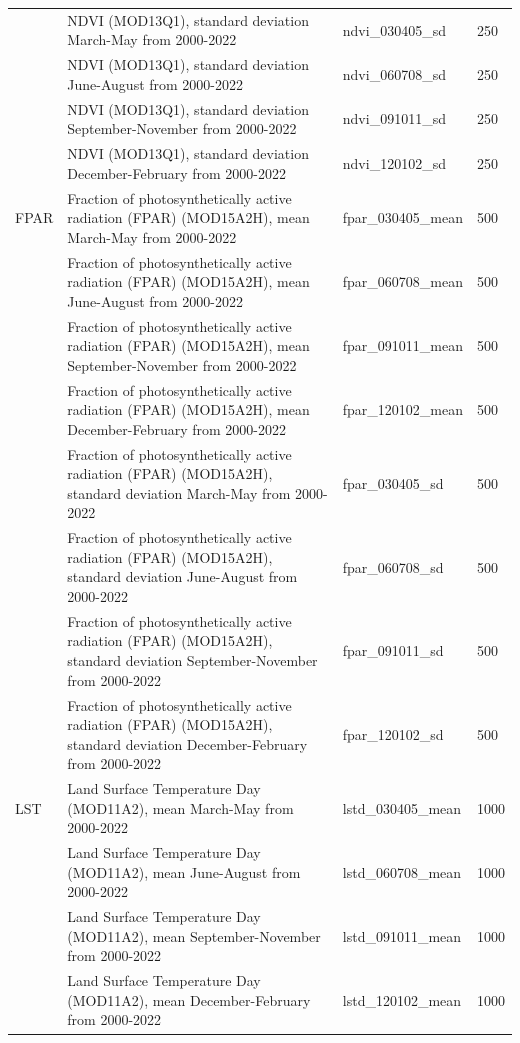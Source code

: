 \documentclass[
  10pt,
  b5paper,
  oneside]{book}
\begin{document}
\begin{longtable}{p{}  p{} p{} p{}}
        & NDVI (MOD13Q1), standard deviation March-May from 2000-2022 & ndvi\_030405\_sd & 250 \\
        & NDVI (MOD13Q1), standard deviation June-August from 2000-2022 & ndvi\_060708\_sd & 250 \\
        & NDVI (MOD13Q1), standard deviation September-November from 2000-2022 & ndvi\_091011\_sd & 250 \\
        & NDVI (MOD13Q1), standard deviation December-February from 2000-2022 & ndvi\_120102\_sd & 250 \\ 
        \hline
        FPAR & Fraction of photosynthetically active radiation (FPAR) (MOD15A2H), mean March-May from 2000-2022 & fpar\_030405\_mean & 500 \\
        & Fraction of photosynthetically active radiation (FPAR) (MOD15A2H), mean June-August from 2000-2022 & fpar\_060708\_mean & 500 \\
        & Fraction of photosynthetically active radiation (FPAR) (MOD15A2H), mean September-November from 2000-2022 & fpar\_091011\_mean & 500 \\
        & Fraction of photosynthetically active radiation (FPAR) (MOD15A2H), mean December-February from 2000-2022 & fpar\_120102\_mean & 500 \\
        & Fraction of photosynthetically active radiation (FPAR) (MOD15A2H), standard deviation March-May from 2000-2022 & fpar\_030405\_sd & 500 \\
        & Fraction of photosynthetically active radiation (FPAR) (MOD15A2H), standard deviation June-August from 2000-2022 & fpar\_060708\_sd & 500 \\
        & Fraction of photosynthetically active radiation (FPAR) (MOD15A2H), standard deviation September-November from 2000-2022 & fpar\_091011\_sd & 500 \\
        & Fraction of photosynthetically active radiation (FPAR) (MOD15A2H), standard deviation December-February from 2000-2022 & fpar\_120102\_sd & 500 \\ 
        \hline
        LST & Land Surface Temperature Day (MOD11A2), mean March-May from 2000-2022 & lstd\_030405\_mean & 1000 \\
        & Land Surface Temperature Day (MOD11A2), mean June-August from 2000-2022 & lstd\_060708\_mean & 1000 \\
        & Land Surface Temperature Day (MOD11A2), mean September-November from 2000-2022 & lstd\_091011\_mean & 1000 \\
        & Land Surface Temperature Day (MOD11A2), mean December-February from 2000-2022 & lstd\_120102\_mean & 1000 \\

\end{longtable}
\end{document}
